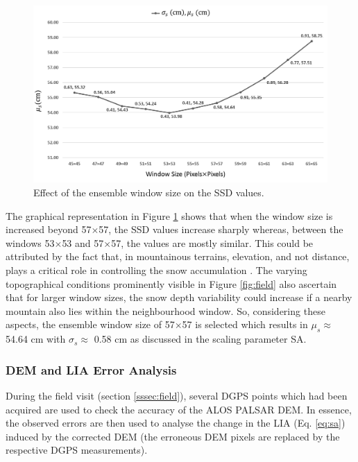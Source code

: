\documentclass[review]{elsarticle}
\numberwithin{equation}{section}
\numberwithin{figure}{section}
\numberwithin{table}{section}
\begin{document}
\begin{figure}[htb]
    \centering
    \includegraphics[width=\textwidth]{Figures/Results/SSD_Res.png}
    \caption{Effect of the ensemble window size on the SSD values.}
    \label{fig:swindow}
\end{figure}

The graphical representation in Figure \ref{fig:swindow} shows that when the window size is increased beyond 57$\times$57, the SSD values increase sharply whereas, between the windows 53$\times$53 and 57$\times$57, the values are mostly similar. This could be attributed by the fact that, in mountainous terrains, elevation, and not distance, plays a critical role in controlling the snow accumulation \citep{Liu2017, Singh2014, Singh2017, Thakur2012}. The varying topographical conditions prominently visible in Figure \ref{fig:field} also ascertain that for larger window sizes, the snow depth variability could increase if a nearby mountain also lies within the neighbourhood window. So, considering these aspects, the ensemble window size of 57$\times$57 is selected which results in $\mu_s \approx$ 54.64 cm with $\sigma_s \approx$ 0.58 cm as discussed in the scaling parameter SA.

\subsubsection{DEM and LIA Error Analysis}
\label{sssec:error}

During the field visit (section \ref{sssec:field}), several DGPS points which had been acquired are used to check the
accuracy of the ALOS PALSAR DEM. In essence, the observed errors are then used to analyse the change in the LIA (Eq. \eqref{eq:sa}) induced by the corrected DEM (the erroneous DEM pixels are replaced by the respective DGPS measurements). 
\end{document}
